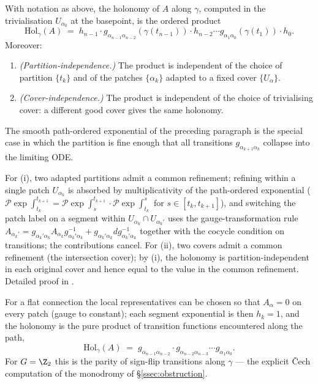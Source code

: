 \begin{proposition}\label{prop:cech-holonomy}
With notation as above, the holonomy of $A$ along $\gamma$, computed
in the trivialisation $U_{\alpha_0}$ at the basepoint, is the ordered
product
\[
   \mathrm{Hol}_\gamma(A) \;=\;
   h_{n-1}\cdot g_{\alpha_{n-1}\alpha_{n-2}}(\gamma(t_{n-1}))
   \cdot h_{n-2}\cdots g_{\alpha_1\alpha_0}(\gamma(t_1))\cdot h_0.
\]
Moreover:
\begin{enumerate}[label=(\roman*),leftmargin=2em]
\item \emph{(Partition-independence.)} The product is independent of
the choice of partition $\{t_k\}$ and of the patches
$\{\alpha_k\}$ adapted to a fixed cover $\{U_\alpha\}$.
\item \emph{(Cover-independence.)} The product is independent of the
choice of trivialising cover: a different good cover gives the same
holonomy.
\end{enumerate}
The smooth path-ordered exponential of the preceding paragraph is the
special case in which the partition is fine enough that all
transitions $g_{\alpha_{k+1}\alpha_k}$ collapse into the limiting
ODE.
\end{proposition}

\begin{proofsketch}
For (i), two adapted partitions admit a common refinement; refining
within a single patch $U_{\alpha_k}$ is absorbed by multiplicativity
of the path-ordered exponential
($\mathcal{P}\exp\int_{t_k}^{t_{k+1}}=\mathcal{P}\exp\int_s^{t_{k+1}}
\cdot\mathcal{P}\exp\int_{t_k}^s$ for $s\in[t_k,t_{k+1}]$), and
switching the patch label on a segment within $U_{\alpha_k}\cap
U_{\alpha_k'}$ uses the gauge-transformation rule
$A_{\alpha_k'}=g_{\alpha_k'\alpha_k}A_{\alpha_k}g_{\alpha_k'\alpha_k}^{-1}
+g_{\alpha_k'\alpha_k}dg_{\alpha_k'\alpha_k}^{-1}$ together with the
cocycle condition on transitions; the contributions cancel. For
(ii), two covers admit a common refinement (the intersection cover);
by (i), the holonomy is partition-independent in each original cover
and hence equal to the value in the common refinement. Detailed proof
in \cite{KobayashiNomizu}.
\end{proofsketch}

\begin{remark}\label{rem:flat-cech}
For a flat connection the local representatives can be chosen so that
$A_\alpha=0$ on every patch (gauge to constant); each segment
exponential is then $h_k=1$, and the holonomy is the pure product of
transition functions encountered along the path,
\[
   \mathrm{Hol}_\gamma(A) \;=\;
   g_{\alpha_{n-1}\alpha_{n-2}}\cdot g_{\alpha_{n-2}\alpha_{n-3}}
   \cdots g_{\alpha_1\alpha_0}.
\]
For $G=\Z_2$ this is the parity of sign-flip transitions along
$\gamma$ --- the explicit Čech computation of the monodromy of
\S\ref{ssec:obstruction}.
\end{remark}

